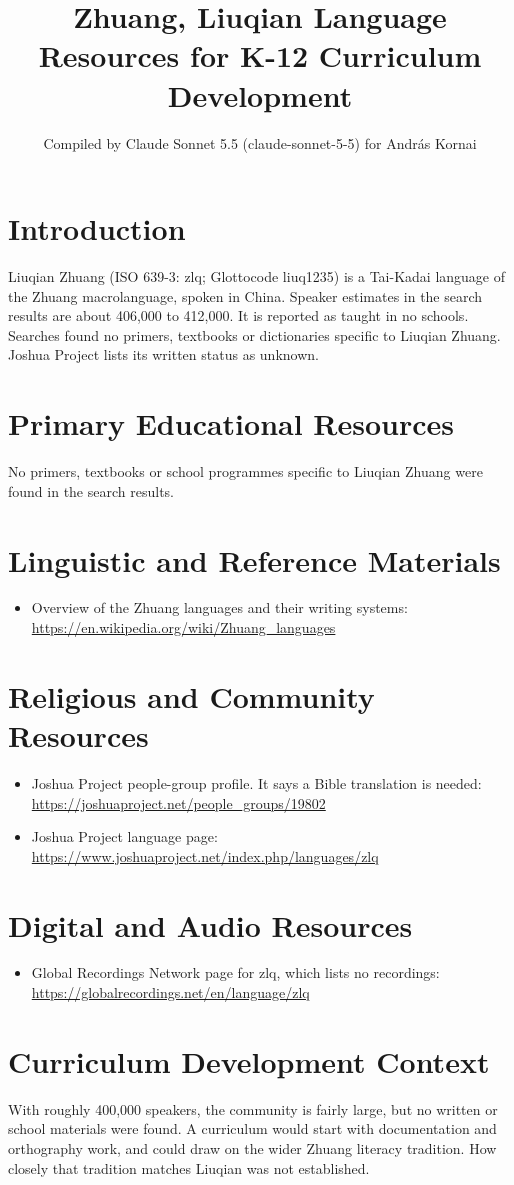 \documentclass[12pt]{article}
\title{Zhuang, Liuqian Language Resources for K-12 Curriculum Development}
\author{Compiled by Claude Sonnet 5.5 (claude-sonnet-5-5) for Andr\'as Kornai}
\date{}
\begin{document}
\maketitle

\section{Introduction}
Liuqian Zhuang (ISO 639-3: zlq; Glottocode liuq1235) is a Tai-Kadai language of the Zhuang macrolanguage, spoken in China. Speaker estimates in the search results are about 406,000 to 412,000. It is reported as taught in no schools. Searches found no primers, textbooks or dictionaries specific to Liuqian Zhuang. Joshua Project lists its written status as unknown.

\section{Primary Educational Resources}
No primers, textbooks or school programmes specific to Liuqian Zhuang were found in the search results.

\section{Linguistic and Reference Materials}
\begin{itemize}
\item Overview of the Zhuang languages and their writing systems: \url{https://en.wikipedia.org/wiki/Zhuang_languages}
\end{itemize}

\section{Religious and Community Resources}
\begin{itemize}
\item Joshua Project people-group profile. It says a Bible translation is needed: \url{https://joshuaproject.net/people_groups/19802}
\item Joshua Project language page: \url{https://www.joshuaproject.net/index.php/languages/zlq}
\end{itemize}

\section{Digital and Audio Resources}
\begin{itemize}
\item Global Recordings Network page for zlq, which lists no recordings: \url{https://globalrecordings.net/en/language/zlq}
\end{itemize}

\section{Curriculum Development Context}
With roughly 400,000 speakers, the community is fairly large, but no written or school materials were found. A curriculum would start with documentation and orthography work, and could draw on the wider Zhuang literacy tradition. How closely that tradition matches Liuqian was not established.
\end{document}
